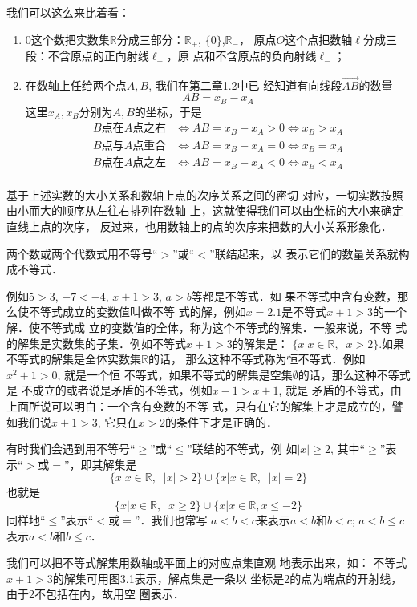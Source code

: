 我们可以这么来比着看：
\begin{enumerate}
    \item 0这个数把实数集$\mathbb{R}$分成三部分：$\mathbb{R}_+$, $\{0\}$,$\mathbb{R}_-$，
原点$O$这个点把数轴$\ell$分成三段：不含原点的正向射线$\ell_+$，原
点和不含原点的负向射线$\ell_-$；
\item 在数轴上任给两个点$A,B$, 我们在第二章1.2中已
经知道有向线段$\Vec{AB}$的数量
\[AB=x_B-x_A\]
这里$x_A,x_B$分别为$A,B$的坐标，于是
\[\begin{split}
    \text{$B$点在$A$点之右}&\Longleftrightarrow AB=x_B-x_A>0\Longleftrightarrow x_B>x_A\\
    \text{$B$点与$A$点重合}&\Longleftrightarrow AB=x_B-x_A=0\Longleftrightarrow x_B=x_A\\
    \text{$B$点在$A$点之左}&\Longleftrightarrow AB=x_B-x_A<0\Longleftrightarrow x_B<x_A\\
\end{split}\]
\end{enumerate}

基于上述实数的大小关系和数轴上点的次序关系之间的密切
对应，一切实数按照由小而大的顺序从左往右排列在数轴
上，这就使得我们可以由坐标的大小来确定直线上点的次序，
反过来，也用数轴上的点的次序来把数的大小关系形象化．

两个数或两个代数式用不等号“$>$”或“$<$”联结起来，以
表示它们的数量关系就构成不等式．

例如$5>3$, $-7<-4$, $x+1>3$, $a>b$等都是不等式．如
果不等式中含有变数，那么使不等式成立的变数值叫做不等
式的解，例如$x=2.1$是不等式$x+1>3$的一个解．使不等式成
立的变数值的全体，称为这个不等式的解集．一般来说，不等
式的解集是实数集的子集．例如不等式$x+1>3$的解集是：
$\{x|x\in\mathbb{R},\;\;x>2\}$.如果不等式的解集是全体实数集$\mathbb{R}$的话，
那么这种不等式称为恒不等式．例如$x^2+1>0$, 就是一个恒
不等式，如果不等式的解集是空集$\emptyset$的话，那么这种不等式是
不成立的或者说是矛盾的不等式，例如$x-1>x+1$, 就是
矛盾的不等式，由上面所说可以明白：一个含有变数的不等
式，只有在它的解集上才是成立的，譬如我们说$x+1>3$,
它只在$x>2$的条件下才是正确的．

有时我们会遇到用不等号“$\ge$”或“$\le$”联结的不等式，例
如$|x|\ge 2$, 其中“$\ge$”表示“$>$或$=$”，即其解集是
$$\{x|x\in\mathbb{R},\;\;|x|>2\}\cup\{x|x\in\mathbb{R},\;\;|x|=2\}$$
也就是$$\{x|x\in\mathbb{R},\;\;x\ge2\}\cup
\{x|x\in\mathbb{R},x\le -2\}$$
同样地“$\le$”表示“$<$或$=$”．我们也常写
$a<b<c$来表示$a<b$和$b<c$; $a<b\le c$表示$a<b$和$b\le c$．

我们可以把不等式解集用数轴或平面上的对应点集直观
地表示出来，如：
不等式$x+1>3$的解集可用图3.1表示，解点集是一条以
坐标是2的点为端点的开射线，由于2不包括在内，故用空
圈表示．

